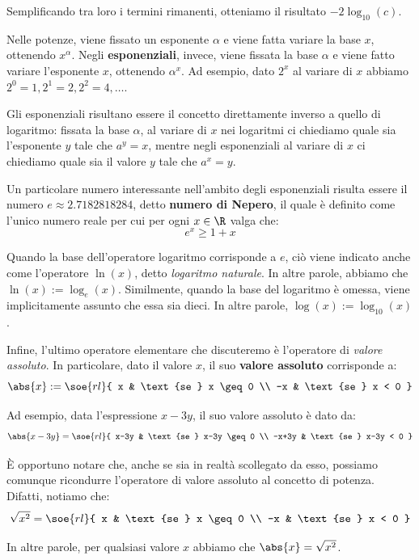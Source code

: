 \documentclass[a4paper, 12pt]{report}
\begin{document}
    Semplificando tra loro i termini rimanenti, otteniamo il risultato $-2\log_{10}(c)$.
    
    Nelle potenze, viene fissato un esponente $\alpha$ e viene fatta variare la base $x$, ottenendo $x^\alpha$. Negli \textbf{esponenziali}, invece, viene fissata la base $\alpha$ e viene fatto variare l'esponente $x$, ottenendo $\alpha^x$. Ad esempio, dato $2^x$ al variare di $x$ abbiamo $2^0 = 1, 2^1 = 2, 2^2 = 4, \ldots$.
    
    Gli esponenziali risultano essere il concetto direttamente inverso a quello di logaritmo: fissata la base $\alpha$, al variare di $x$ nei logaritmi ci chiediamo quale sia l'esponente $y$ tale che $a^y = x$, mentre negli esponenziali al variare di $x$ ci chiediamo quale sia il valore $y$ tale che $a^x = y$.

    Un particolare numero interessante nell'ambito degli esponenziali risulta essere il numero $e \approx 2.7182818284$, detto \textbf{numero di Nepero}, il quale è definito come l'unico numero reale per cui per ogni $x \in \R$ valga che:
    \[e^x \geq 1+x\]

    Quando la base dell'operatore logaritmo corrisponde a $e$, ciò viene indicato anche come l'operatore $\ln(x)$, detto \textit{logaritmo naturale}. In altre parole, abbiamo che $\ln(x) := \log_e(x)$. Similmente, quando la base del logaritmo è omessa, viene implicitamente assunto che essa sia dieci. In altre parole, $\log(x) := \log_{10}(x)$.

    Infine, l'ultimo operatore elementare che discuteremo è l'operatore di \textit{valore assoluto}. In particolare, dato il valore $x$, il suo \textbf{valore assoluto} corrisponde a:
    \[\abs{x} := \soe{rl}{
        x & \text{se } x \geq 0 \\
        -x & \text{se } x < 0
    }\]

    Ad esempio, data l'espressione $x-3y$, il suo valore assoluto è dato da:
    \[\abs{x-3y} = \soe{rl}{
        x-3y & \text{se } x-3y \geq 0 \\
        -x+3y & \text{se } x-3y < 0
    }\]

    È opportuno notare che, anche se sia in realtà scollegato da esso, possiamo comunque ricondurre l'operatore di valore assoluto al concetto di potenza. Difatti, notiamo che:
    \[\sqrt{x^2} = \soe{rl}{
        x & \text{se } x \geq 0 \\
        -x & \text{se } x < 0
    }\]

    In altre parole, per qualsiasi valore $x$ abbiamo che $\abs{x} = \sqrt{x^2}$.
\end{document}
